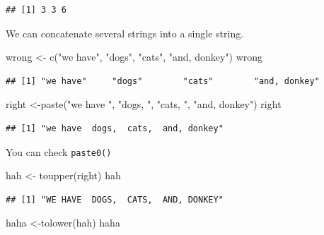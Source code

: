 \documentclass[
]{book}
\newenvironment{Shaded}{\begin{snugshade}}{\end{snugshade}}
\newcommand{\FunctionTok}[1]{\textcolor[rgb]{0.00,0.00,0.00}{#1}}
\newcommand{\NormalTok}[1]{#1}
\newcommand{\OtherTok}[1]{\textcolor[rgb]{0.56,0.35,0.01}{#1}}
\newcommand{\StringTok}[1]{\textcolor[rgb]{0.31,0.60,0.02}{#1}}
\begin{document}
\begin{verbatim}
## [1] 3 3 6
\end{verbatim}

We can concatenate several strings into a single string.

\begin{Shaded}
\begin{Highlighting}[]
\NormalTok{wrong }\OtherTok{\textless{}{-}} \FunctionTok{c}\NormalTok{(}\StringTok{"we have"}\NormalTok{, }\StringTok{"dogs"}\NormalTok{, }\StringTok{"cats"}\NormalTok{, }\StringTok{"and, donkey"}\NormalTok{)}
\NormalTok{wrong}
\end{Highlighting}
\end{Shaded}

\begin{verbatim}
## [1] "we have"     "dogs"        "cats"        "and, donkey"
\end{verbatim}

\begin{Shaded}
\begin{Highlighting}[]
\NormalTok{right }\OtherTok{\textless{}{-}}\FunctionTok{paste}\NormalTok{(}\StringTok{"we have "}\NormalTok{, }\StringTok{"dogs, "}\NormalTok{, }\StringTok{"cats, "}\NormalTok{, }\StringTok{"and, donkey"}\NormalTok{)}
\NormalTok{right}
\end{Highlighting}
\end{Shaded}

\begin{verbatim}
## [1] "we have  dogs,  cats,  and, donkey"
\end{verbatim}

You can check \texttt{paste0()}

\begin{Shaded}
\begin{Highlighting}[]
\NormalTok{hah }\OtherTok{\textless{}{-}} \FunctionTok{toupper}\NormalTok{(right)}
\NormalTok{hah}
\end{Highlighting}
\end{Shaded}

\begin{verbatim}
## [1] "WE HAVE  DOGS,  CATS,  AND, DONKEY"
\end{verbatim}

\begin{Shaded}
\begin{Highlighting}[]
\NormalTok{haha }\OtherTok{\textless{}{-}}\FunctionTok{tolower}\NormalTok{(hah) }
\NormalTok{haha}
\end{Highlighting}
\end{Shaded}
\end{document}
